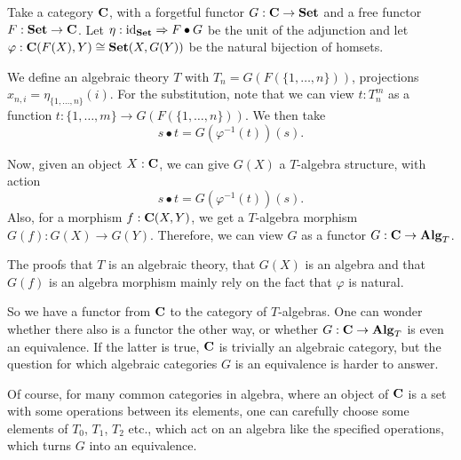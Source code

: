 \begin{example}
  Take a category $ \mathbf{C} $, with a forgetful functor $ G: \mathbf{C} \to \mathbf{Set} $ and a free functor $ F: \mathbf{Set} \to \mathbf{C} $. Let $ \eta: \text{id}_{\mathbf{Set}} \Rightarrow F \bullet G $ be the unit of the adjunction and let $ \varphi: \mathbf{C}(F(X), Y) \cong \mathbf{Set}(X, G(Y)) $ be the natural bijection of homsets.

  We define an algebraic theory $ T $ with $ T_n = G(F(\{ 1, \dots, n \})) $, projections $ x_{n, i} = \eta_{\{1, \dots, n\}}(i) $. For the substitution, note that we can view $ t: T_n^m $ as a function $ t: \{ 1, \dots, m \} \to G(F(\{ 1, \dots, n \})) $. We then take
  \[ s \bullet t = G(\varphi^{-1}(t))(s). \]

  Now, given an object $ X: \mathbf{C} $, we can give $ G(X) $ a $ T $-algebra structure, with action
  \[ s \bullet t = G(\varphi^{-1}(t))(s). \]
  Also, for a morphism $ f: \mathbf{C}(X, Y) $, we get a $ T $-algebra morphism $ G(f): G(X) \to G(Y) $. Therefore, we can view $ G $ as a functor $ G: \mathbf{C} \to \mathbf{Alg}_{T} $.
\end{example}

The proofs that $ T $ is an algebraic theory, that $ G(X) $ is an algebra and that $ G(f) $ is an algebra morphism mainly rely on the fact that $ \varphi $ is natural.

So we have a functor from $ \mathbf{C} $ to the category of $ T $-algebras. One can wonder whether there also is a functor the other way, or whether $ G: \mathbf{C} \to \mathbf{Alg}_{T} $ is even an equivalence. If the latter is true, $ \mathbf{C} $ is trivially an algebraic category, but the question for which algebraic categories $ G $ is an equivalence is harder to answer.

Of course, for many common categories in algebra, where an object of $ \mathbf{C} $ is a set with some operations between its elements, one can carefully choose some elements of $ T_0 $, $ T_1 $, $ T_2 $ etc., which act on an algebra like the specified operations, which turns $ G $ into an equivalence.

